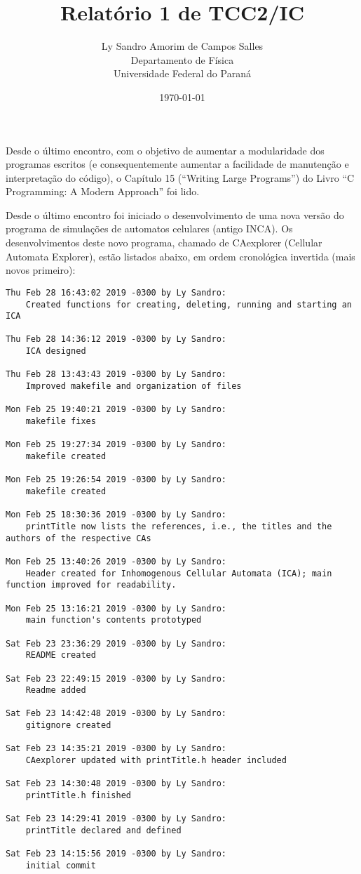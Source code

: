 \documentclass[12pt,a4paper,final]{article}
\title{Relatório 1 de TCC2/IC}
\author{Ly Sandro Amorim de Campos Salles\\Departamento de Física\\Universidade Federal do Paraná}
\date{\today}
\begin{document}
	\maketitle

	Desde o último encontro, com o objetivo de aumentar a modularidade dos programas escritos (e consequentemente aumentar a facilidade de manutenção e interpretação do código), o Capítulo 15 (``Writing Large Programs'') do Livro ``C Programming: A Modern Approach'' foi lido.

	Desde o último encontro foi iniciado o desenvolvimento de uma nova versão do programa de simulações de automatos celulares (antigo INCA). Os desenvolvimentos deste novo programa, chamado de CAexplorer (Cellular Automata Explorer), estão listados abaixo, em ordem cronológica invertida (mais novos primeiro):

	\begin{lstlisting}
Thu Feb 28 16:43:02 2019 -0300 by Ly Sandro:
    Created functions for creating, deleting, running and starting an ICA

Thu Feb 28 14:36:12 2019 -0300 by Ly Sandro:
    ICA designed

Thu Feb 28 13:43:43 2019 -0300 by Ly Sandro:
    Improved makefile and organization of files

Mon Feb 25 19:40:21 2019 -0300 by Ly Sandro:
    makefile fixes

Mon Feb 25 19:27:34 2019 -0300 by Ly Sandro:
    makefile created

Mon Feb 25 19:26:54 2019 -0300 by Ly Sandro:
    makefile created

Mon Feb 25 18:30:36 2019 -0300 by Ly Sandro:
    printTitle now lists the references, i.e., the titles and the authors of the respective CAs

Mon Feb 25 13:40:26 2019 -0300 by Ly Sandro:
    Header created for Inhomogenous Cellular Automata (ICA); main function improved for readability.

Mon Feb 25 13:16:21 2019 -0300 by Ly Sandro:
    main function's contents prototyped

Sat Feb 23 23:36:29 2019 -0300 by Ly Sandro:
    README created

Sat Feb 23 22:49:15 2019 -0300 by Ly Sandro:
    Readme added

Sat Feb 23 14:42:48 2019 -0300 by Ly Sandro:
    gitignore created

Sat Feb 23 14:35:21 2019 -0300 by Ly Sandro:
    CAexplorer updated with printTitle.h header included

Sat Feb 23 14:30:48 2019 -0300 by Ly Sandro:
    printTitle.h finished

Sat Feb 23 14:29:41 2019 -0300 by Ly Sandro:
    printTitle declared and defined

Sat Feb 23 14:15:56 2019 -0300 by Ly Sandro:
    initial commit

	\end{lstlisting}
\end{document}

